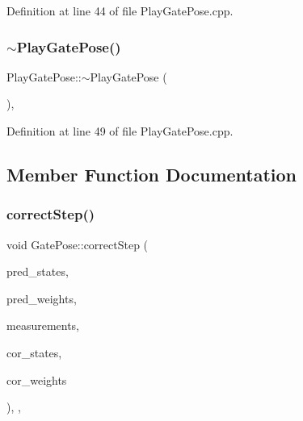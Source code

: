 Definition at line 44 of file Play\+Gate\+Pose.\+cpp.

\mbox{\label{classPlayGatePose_a06fd05c14cdfc88a04a7d860c7c66bf6}} 
\subsubsection{\texorpdfstring{$\sim$\+Play\+Gate\+Pose()}{~PlayGatePose()}}
{\footnotesize\ttfamily Play\+Gate\+Pose\+::$\sim$\+Play\+Gate\+Pose (\begin{DoxyParamCaption}{ }\end{DoxyParamCaption})\hspace{0.3cm}{\ttfamily [override]}, {\ttfamily [noexcept]}}



Definition at line 49 of file Play\+Gate\+Pose.\+cpp.



\subsection{Member Function Documentation}
\mbox{\label{classGatePose_a91d395abe75dc7772116f50219dc19ae}} 
\subsubsection{\texorpdfstring{correct\+Step()}{correctStep()}}
{\footnotesize\ttfamily void Gate\+Pose\+::correct\+Step (\begin{DoxyParamCaption}\item[{const Eigen\+::\+Ref$<$ const Eigen\+::\+Matrix\+Xf $>$ \&}]{pred\+\_\+states,  }\item[{const Eigen\+::\+Ref$<$ const Eigen\+::\+Vector\+Xf $>$ \&}]{pred\+\_\+weights,  }\item[{cv\+::\+Input\+Array}]{measurements,  }\item[{Eigen\+::\+Ref$<$ Eigen\+::\+Matrix\+Xf $>$}]{cor\+\_\+states,  }\item[{Eigen\+::\+Ref$<$ Eigen\+::\+Vector\+Xf $>$}]{cor\+\_\+weights }\end{DoxyParamCaption})\hspace{0.3cm}{\ttfamily [override]}, {\ttfamily [protected]}, {\ttfamily [inherited]}}



